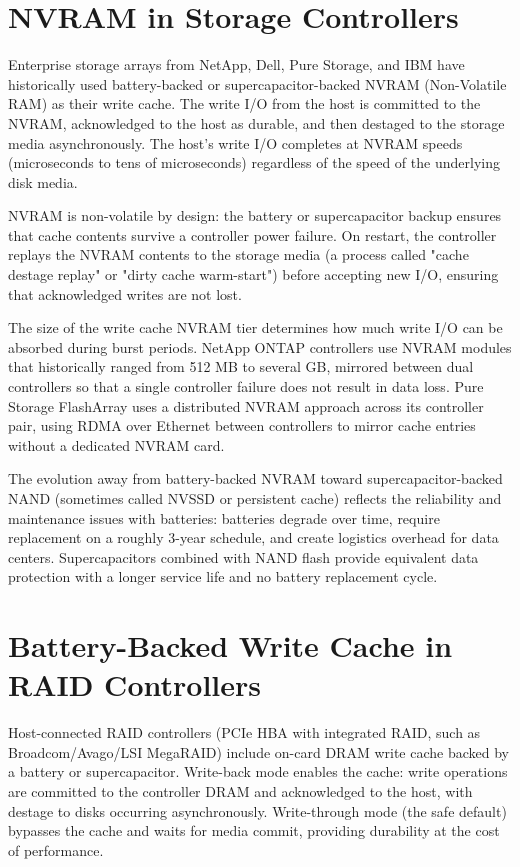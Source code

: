 \section{NVRAM in Storage Controllers}
Enterprise storage arrays from NetApp, Dell, Pure Storage, and IBM have historically used battery-backed or supercapacitor-backed NVRAM (Non-Volatile RAM) as their write cache. The write I/O from the host is committed to the NVRAM, acknowledged to the host as durable, and then destaged to the storage media asynchronously. The host's write I/O completes at NVRAM speeds (microseconds to tens of microseconds) regardless of the speed of the underlying disk media.

NVRAM is non-volatile by design: the battery or supercapacitor backup ensures that cache contents survive a controller power failure. On restart, the controller replays the NVRAM contents to the storage media (a process called "cache destage replay" or "dirty cache warm-start") before accepting new I/O, ensuring that acknowledged writes are not lost.

The size of the write cache NVRAM tier determines how much write I/O can be absorbed during burst periods. NetApp ONTAP controllers use NVRAM modules that historically ranged from 512 MB to several GB, mirrored between dual controllers so that a single controller failure does not result in data loss. Pure Storage FlashArray uses a distributed NVRAM approach across its controller pair, using RDMA over Ethernet between controllers to mirror cache entries without a dedicated NVRAM card.

The evolution away from battery-backed NVRAM toward supercapacitor-backed NAND (sometimes called NVSSD or persistent cache) reflects the reliability and maintenance issues with batteries: batteries degrade over time, require replacement on a roughly 3-year schedule, and create logistics overhead for data centers. Supercapacitors combined with NAND flash provide equivalent data protection with a longer service life and no battery replacement cycle.

\section{Battery-Backed Write Cache in RAID Controllers}
Host-connected RAID controllers (PCIe HBA with integrated RAID, such as Broadcom/Avago/LSI MegaRAID) include on-card DRAM write cache backed by a battery or supercapacitor. Write-back mode enables the cache: write operations are committed to the controller DRAM and acknowledged to the host, with destage to disks occurring asynchronously. Write-through mode (the safe default) bypasses the cache and waits for media commit, providing durability at the cost of performance.

